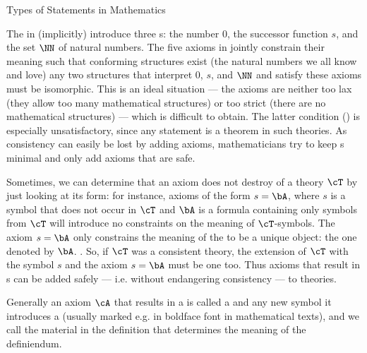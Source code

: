 \begin{omgroup}[short=Mathematical Statements,id=statements]
\begin{omgroup}[id=statements-constitutive]{Types of Statements in Mathematics}
\begin{module}[id=statementtypes]
\begin{omtext}
The {} in {} (implicitly) introduce three
{s}: the number 0, the successor function $s$, and the set $\NN$ of
natural numbers. The five axioms in {} jointly constrain their meaning
such that conforming structures exist (the natural numbers we all know and love) any two
structures that interpret 0, $s$, and $\NN$ and satisfy these axioms must be isomorphic.
This is an ideal situation --- the axioms are neither too lax (they allow too many
mathematical structures) or too strict (there are no mathematical structures) --- which is
difficult to obtain. The latter condition () is
especially unsatisfactory, since any statement is a theorem in such theories. As
consistency can easily be lost by adding axioms, mathematicians try to keep
{s} minimal and only add axioms that are safe.
\end{omtext}

\begin{omtext}
  Sometimes, we can determine that an axiom does not destroy {} of a
  theory $\cT$ by just looking at its form: for instance, axioms of the form $s=\bA$,
  where $s$ is a symbol that does not occur in $\cT$ and $\bA$ is a formula containing
  only symbols from $\cT$ will introduce no constraints on the meaning of
  $\cT$-symbols. The axiom $s=\bA$ only constrains the meaning of the
  {} to be a unique object: the one denoted by $\bA$. . So, if $\cT$ was a
  consistent theory, the extension of $\cT$ with the symbol $s$ and the axiom $s=\bA$ must
  be one too. Thus axioms that result in {s} can be added
  safely --- i.e. without endangering consistency --- to theories.
\end{omtext}

\begin{definition}[display=flow,id=conservative-extension.def]
  Generally an axiom $\cA$ that results in a {} is called
  a  and any new symbol it introduces a  (usually
  marked e.g. in boldface font in mathematical texts), and we call  the
  material in the definition that determines the meaning of the definiendum.
\end{definition}
\end{module}
\end{omgroup}


\end{omgroup}
